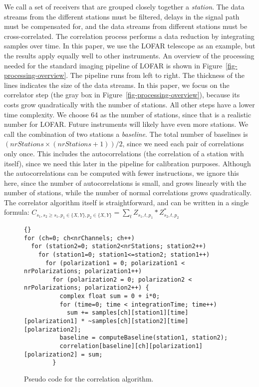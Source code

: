 \documentclass{article}
\begin{document}
We call a set of receivers that are grouped closely
together a \emph{station}. The data streams from the different
stations must be filtered, delays in the signal path must be
compensated for, and the data streams from different stations must be
cross-correlated. The correlation process performs a data reduction by
integrating samples over time. In this paper, we use the LOFAR
telescope as an example, but the results apply equally well
to other instruments. An overview of the processing needed for the
standard imaging pipeline of LOFAR is shown in
Figure~\ref{fig-processing-overview}. The pipeline runs from left to right.
The thickness of the lines indicates the size of the data streams.
In this paper, we focus on the
correlator step (the gray box in
Figure~\ref{fig-processing-overview}), because its costs grow
quadratically with the number of stations. All other steps have a
lower time complexity. We choose 64 as the number of stations, since
that is a realistic number for LOFAR.  Future instruments will likely
have even more stations. We call the combination of two stations a
\emph{baseline}.  The total number of baselines is $(nrStations \times
(nrStations + 1)) / 2$, since we need each pair of correlations only
once. This includes the autocorrelations (the correlation of a station with itself),
since we need this later in the pipeline for calibration purposes.
Although the autocorrelations can be computed with fewer instructions, we 
ignore this here, since the number of autocorrelations is small, and grows
linearly with the number of stations, while the number of normal correlations
grows quadratically.
The correlator algorithm itself is straightforward, and can be
written in a single formula:
$C_{s_1,s_2\geq s_1,p_1\in\{X,Y\},p_2\in\{X,Y\}} = \displaystyle\sum_{t} Z_{s_1,t,p_1} * Z_{s_2,t,p_2}^\ast$ 


\begin{figure*}[t]
\begin{lstlisting}{}
for (ch=0; ch<nrChannels; ch++)
  for (station2=0; station2<nrStations; station2++)
    for (station1=0; station1<=station2; station1++)
      for (polarization1 = 0; polarization1 < nrPolarizations; polarization1++)
        for (polarization2 = 0; polarization2 < nrPolarizations; polarization2++) {
          complex float sum = 0 + i*0;
          for (time=0; time < integrationTime; time++)
            sum += samples[ch][station1][time][polarization1] * ~samples[ch][station2][time][polarization2];
          baseline = computeBaseline(station1, station2);
          correlation[baseline][ch][polarization1][polarization2] = sum;
        }
\end{lstlisting}
\vspace{-0.5cm}
\caption{Pseudo code for the correlation algorithm.}
\label{correlator-code}
\end{figure*}
\end{document}
